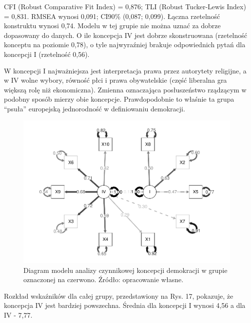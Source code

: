 \documentclass[12pt]{article}
\begin{document}
CFI (Robust Comparative Fit Index) = 0,876; TLI (Robust Tucker-Lewis Index) = 0,831. RMSEA wynosi 0,091; CI90\% (0,087; 0,099). Łączna rzetelność konstruktu wynosi 0,74. Modelu w tej grupie nie można uznać za dobrze dopasowany do danych. O ile koncepcja IV jest dobrze skonstruowana (rzetelność konceptu na poziomie 0,78), o tyle najwyraźniej brakuje odpowiednich pytań dla koncepcji I (rzetelność 0,56).

W koncepcji I najważniejsza jest interpretacja prawa przez autorytety religijne, a w IV wolne wybory, równość płci i prawa obywatelskie (część liberalna gra większą rolę niż ekonomiczna). Zmienna oznaczająca posłuszeństwo rządzącym w podobny sposób mierzy obie koncepcje. Prawdopodobnie to właśnie ta grupa ``psuła'' europejską jednorodność w definiowaniu demokracji.

\begin{figure}

{\centering \includegraphics{text_ASA_files/figure-latex/diagram-3-1} 

}

\caption{Diagram modelu analizy czynnikowej koncepcji demokracji w grupie oznaczonej na czerwono. Źródło: opracowanie własne.}\label{fig:diagram-3}
\end{figure}

Rozkład wskaźników dla całej grupy, przedstawiony na Rys. 17, pokazuje, że koncepcja IV jest bardziej powszechna. Średnia dla koncepcji I wynosi 4,56 a dla IV - 7,77.
\end{document}
